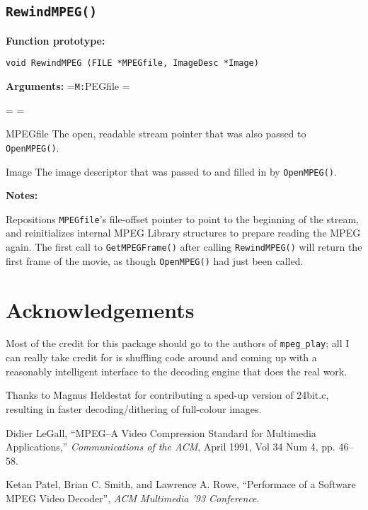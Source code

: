 \documentclass[11pt]{article}
\newcommand{\code}[1]{\texttt{#1}}
\newcommand{\ttlabel}[1]{\texttt{#1:}\quad\hfil}
\newenvironment{ttdescription}[1] {\newbox\holder
  \setbox\holder=\hbox{\ttlabel#1} \dimen0=\wd\holder
 \begin{list}{}
   {\labelsep=-0.25in \rightmargin=0.25in \leftmargin=\dimen0
     \addtolength{\leftmargin}{0.25in}
  \labelwidth=\leftmargin
  \let\makelabel\ttlabel}}%
{\end{list}}
\newcommand{\prototype}[1]{%
  \textbf{Function prototype:}\par \smallskip \code{#1}\par\medskip }
\newenvironment{Arguments}[1]{%
\noindent\textbf{Arguments:}%
\begin{ttdescription}{#1}}
{\end{ttdescription}\medskip}
\newenvironment{Notes}{%
\noindent\textbf{Notes:}\par\smallskip}
{\medskip}
\begin{document}
\subsection{\code{RewindMPEG()}}
\prototype{void RewindMPEG (FILE *MPEGfile, ImageDesc *Image)}
\begin{Arguments}{MPEGfile}
\item[MPEGfile] The open, readable stream pointer that was also passed
  to \code{OpenMPEG()}.
\item[Image] The image descriptor that was passed to and filled in by
  \code{OpenMPEG()}.
\end{Arguments}
\begin{Notes}
  Repositions \code{MPEGfile}'s file-offset pointer to point to the
  beginning of the stream, and reinitializes internal MPEG Library
  structures to prepare reading the MPEG again.  The first call to
  \code{GetMPEGFrame()} after calling \code{RewindMPEG()} will return
  the first frame of the movie, as though \code{OpenMPEG()} had just
  been called.
\end{Notes}

\section*{Acknowledgements}
Most of the credit for this package should go to the authors of
\code{mpeg\_play}; all I can really take credit for is shuffling code
around and coming up with a reasonably intelligent interface to the
decoding engine that does the real work.  

Thanks to Magnus Heldestat for contributing a sped-up version of
24bit.c, resulting in faster decoding/dithering of full-colour images.

\begin{thebibliography}{0}
   Didier LeGall, ``MPEG--A Video Compression
  Standard for Multimedia Applications,'' {\em Communications of the
    ACM\/}, April 1991, Vol 34 Num 4, pp. 46--58.

   Ketan Patel, Brian C. Smith, and Lawrence A. Rowe,
  ``Performace of a Software MPEG Video Decoder'', {\em ACM Multimedia
    '93 Conference}.
\end{thebibliography}
\end{document}
